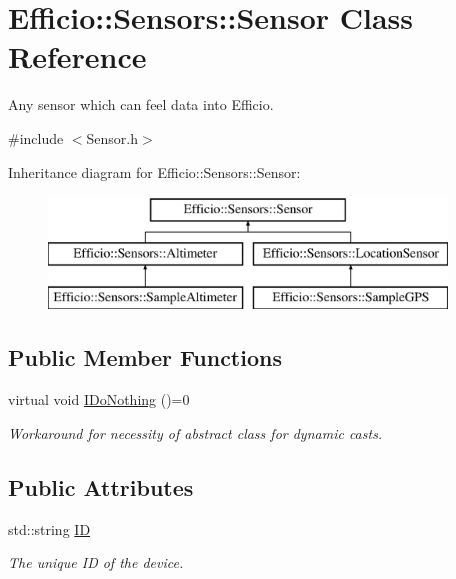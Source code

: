 \hypertarget{class_efficio_1_1_sensors_1_1_sensor}{}\section{Efficio\+:\+:Sensors\+:\+:Sensor Class Reference}
\label{class_efficio_1_1_sensors_1_1_sensor}


Any sensor which can feel data into Efficio.  




{\ttfamily \#include $<$Sensor.\+h$>$}

Inheritance diagram for Efficio\+:\+:Sensors\+:\+:Sensor\+:\begin{figure}[H]
\begin{center}
\leavevmode
\includegraphics[height=3.000000cm]{class_efficio_1_1_sensors_1_1_sensor}
\end{center}
\end{figure}
\subsection*{Public Member Functions}
\begin{DoxyCompactItemize}
\item 
virtual void \hyperlink{class_efficio_1_1_sensors_1_1_sensor_a813778c442cce58aa0b839a773e37615}{I\+Do\+Nothing} ()=0\hypertarget{class_efficio_1_1_sensors_1_1_sensor_a813778c442cce58aa0b839a773e37615}{}\label{class_efficio_1_1_sensors_1_1_sensor_a813778c442cce58aa0b839a773e37615}

\begin{DoxyCompactList}\small\item\em Workaround for necessity of abstract class for dynamic casts. \end{DoxyCompactList}\end{DoxyCompactItemize}
\subsection*{Public Attributes}
\begin{DoxyCompactItemize}
\item 
std\+::string \hyperlink{class_efficio_1_1_sensors_1_1_sensor_a8ac4e06e23c5253182c73ec1b882682a}{ID}\hypertarget{class_efficio_1_1_sensors_1_1_sensor_a8ac4e06e23c5253182c73ec1b882682a}{}\label{class_efficio_1_1_sensors_1_1_sensor_a8ac4e06e23c5253182c73ec1b882682a}

\begin{DoxyCompactList}\small\item\em The unique ID of the device. \end{DoxyCompactList}\end{DoxyCompactItemize}


